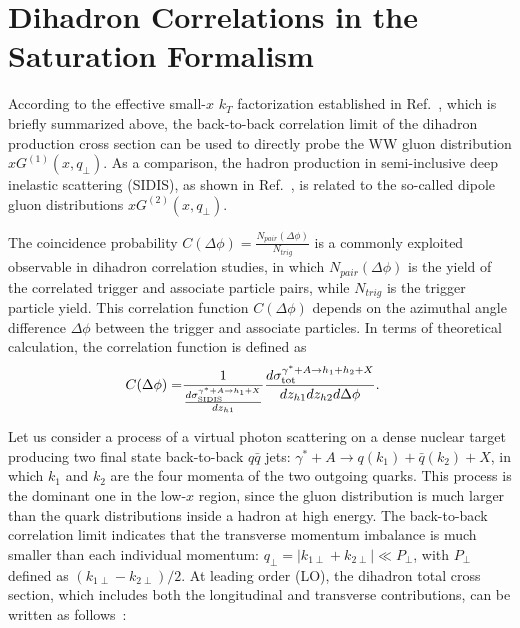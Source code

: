 \section{Dihadron Correlations in the Saturation Formalism}\label{sec:dihadrontheory}

According to the effective small-$x$ $k_T$ factorization established in
Ref.~\cite{Dominguez:2011wm}, which is briefly summarized above, the
back-to-back correlation limit of the dihadron production cross section can be used
to directly probe the WW gluon distribution $xG^{(1)}(x,q_{\perp})$. As a
comparison, the hadron production in semi-inclusive deep inelastic scattering
(SIDIS), as shown in Ref.~\cite{Marquet:2009ca}, is related to the so-called
dipole gluon distributions $xG^{(2)}(x,q_{\perp})$.

The coincidence probability $C(\Delta\phi)=\frac{N_{pair}(\Delta\phi)}{N_{trig}}$ is a
commonly exploited observable in dihadron correlation studies, in which
$N_{pair}(\Delta\phi)$ is the yield of the correlated trigger and associate
particle pairs, while $N_{trig}$ is the trigger particle yield. This
correlation function $C(\Delta\phi)$ depends on the azimuthal angle difference $\Delta\phi$
between the trigger and associate particles. In terms of theoretical
calculation, the correlation function is defined as
\begin{eqnarray} 
C(\Delta\phi) 
= & \frac{1}{\frac{d\sigma^{\gamma^{*}+A\rightarrow h_{1}+X}_{\textrm{SIDIS}}}{dz_{h1}}}
\frac{d\sigma^{\gamma^{*}+A\rightarrow h_{1}+h_{2}+X}_{\textrm{tot}}}{dz_{h1}dz_{h2}d\Delta\phi}.
\label{eqn:cdphiCGC} 
\end{eqnarray}

Let us consider a process of a virtual photon scattering on a dense nuclear target
producing two final state back-to-back $q\bar q$ jets:
$\gamma^{*}+A\rightarrow q(k_{1})+\bar{q}(k_{2})+X$, in which $k_1$ and $k_2$ are
the four momenta of the two outgoing quarks. This process is the
dominant one in the low-$x$ region, since the gluon distribution is much larger than
the quark distributions inside a hadron at high energy. The back-to-back correlation
limit indicates that the transverse momentum imbalance is much smaller than each
individual momentum: $q_{\perp}=|k_{1\perp}+k_{2\perp}|\ll P_{\perp}$, with
$P_{\perp}$ defined as $(k_{1\perp}-k_{2\perp})/2$. At leading order (LO), the
dihadron total cross section, which includes both the longitudinal and
transverse contributions, can be written as follows~\cite{Dominguez:2011wm}:

